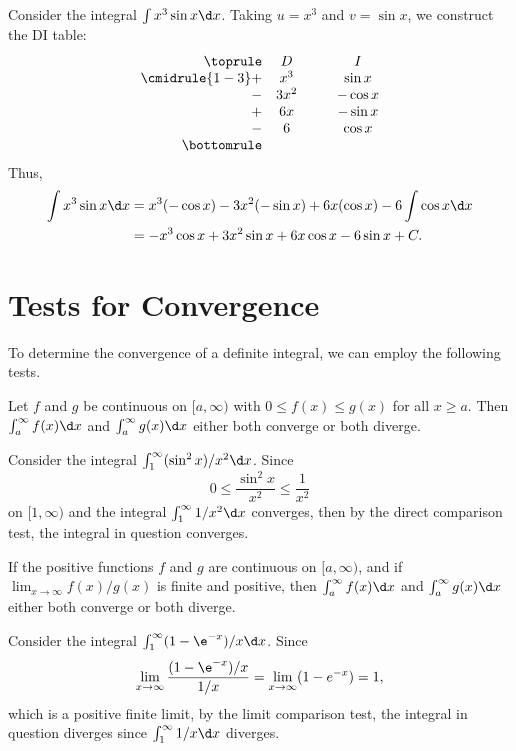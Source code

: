 \begin{example}[DI Method]
    Consider the integral $\int x^3 \sin x \d x$. Taking $u = x^3$ and $v = \sin x$, we construct the DI table:
    \[
    \begin{array}{r c @{\hspace*{1.0cm}} c}\toprule
        & D & I \\\cmidrule{1-3}
        + & x^3 & \sin x \\
        - & 3x^2 & -\cos x \\
        + & 6x & -\sin x\\
        - & 6 & \cos x\\\bottomrule
    \end{array}
    \]
    Thus,
    \begin{align*}
        \int x^3 \sin x \d x &= x^3 (-\cos x) - 3x^2(-\sin x) + 6x(\cos x) - 6\int \cos x \d x\\
        &= -x^3 \cos x + 3x^2 \sin x + 6x\cos x - 6\sin x + C.
    \end{align*}
\end{example}

\section{Tests for Convergence}

To determine the convergence of a definite integral, we can employ the following tests.

\begin{proposition}
    Let $f$ and $g$ be continuous on $[a, \infty)$ with $0 \leq f(x) \leq g(x)$ for all $x \geq a$. Then $\int_a^\infty f(x) \d x$ and $\int_a^\infty g(x) \d x$ either both converge or both diverge.
\end{proposition}

\begin{example}
    Consider the integral $\int_1^\infty (\sin^2 x)/x^2 \d x$. Since \[0 \leq \frac{\sin^2 x}{x^2} \leq \frac1{x^2}\] on $[1, \infty)$ and the integral $\int_1^\infty 1/x^2 \d x$ converges, then by the direct comparison test, the integral in question converges.
\end{example}

\begin{proposition}
    If the positive functions $f$ and $g$ are continuous on $[a, \infty)$, and if $\lim_{x \to \infty} f(x)/g(x)$ is finite and positive, then $\int_a^\infty f(x) \d x$ and $\int_a^\infty g(x) \d x$ either both converge or both diverge.
\end{proposition}

\begin{example}
    Consider the integral $\int_1^\infty (1-\e^{-x})/x \d x$. Since \[\lim_{x \to \infty} \frac{(1-\e^{-x})/x}{1/x} = \lim_{x \to \infty} (1 - e^{-x}) = 1,\] which is a positive finite limit, by the limit comparison test, the integral in question diverges since $\int_1^\infty 1/x \d x$ diverges.
\end{example}